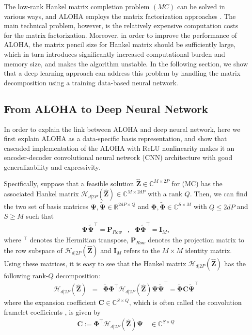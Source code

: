 \documentclass[num-refs]{wiley-article}
\newcommand{\Bb}{{\mathbf B}}
\newcommand{\Cb}{{\mathbf{C}}}
\newcommand{\Ib}{{\mathbf I}}
\newcommand{\Pb}{{\mathbf P}}
\newcommand{\Zb}{{\mathbf Z}}
\newcommand{\Phib}{{\boldsymbol {\Phi}}}
\newcommand{\Psib}{{\boldsymbol {\Psi}}}
\newcommand{\Rd}{{\mathbb R}}
\newcommand{\Cd}{{\mathbb C}}
\newcommand{\0}{{\boldsymbol{0}}}
\newcommand{\hank}{\mathscr{H}}
\newcommand{\1}{\blmath{1}}
\begin{document}
	
	The low-rank Hankel matrix completion problem $(MC)$ can be solved in various ways, and ALOHA employs
	the matrix factorization approaches  \cite{jin2016general,lee2016acceleration,Lee2016reference}. 
	The main technical problem, however, is the relatively expensive computation costs for the matrix factorization.
	Moreover, in order to improve the performance of ALOHA, the  matrix pencil size for Hankel matrix should  be sufficiently large, which in turn introduces significantly increased computational burden and memory size, and makes the algorithm unstable.
	In the following section, we show that a deep learning approach can address this problem by handling the matrix decomposition using a training data-based neural network.
	
	
	\subsection{From ALOHA to Deep Neural Network} 
	
	In order to explain the link between ALOHA and deep neural network, 
	here we first explain ALOHA as a data-specific basis representation, and  show that cascaded implementation of the
	ALOHA with ReLU nonlinearity makes it an encoder-decoder convolutional neural network  (CNN) architecture with
	good generalizability and expressivity.
	
	
	Specifically, suppose that a feasible solution  $\hat\Zb \in \Cd^{M\times 2P}$ for (MC)  has  the associated Hankel matrix
	$\hank_{d|2P}(\widehat\Zb) \in \Cd^{M\times 2dP}$ with a rank $Q$.
	Then, we can find the two set of basis matrices
	$\Psib, \widetilde{\Psib}\in \Rd^{2dP \times Q}$  and  $\Phib, \widetilde{\Phib} \in \Cd^{S \times M}$ with $Q\leq 2dP$ and $S\geq M$
	such that
	\begin{eqnarray}\label{eq:projection}
	\Psib \widetilde \Psib^{\top} = \Pb_{Row}&,& \Phib \widetilde \Phib^{\top} = \Ib_{M},
	\end{eqnarray}
	where $^\top$ denotes the Hermitian transpose,
	$\Pb_{Row}$ denotes the projection matrix to the row subspace of $\hank_{d|2P}(\hat \Zb)$ and $\Ib_M$ refers to the $M\times M$ identity matrix.
	Using these matrices, it is easy to see that 
	the Hankel matrix $\hank_{d|2P}(\widehat\Zb)$ has the following rank-$Q$ decomposition:
	\begin{eqnarray}
	\hank_{d|2P}\left(\widehat \Zb \right) &=& \widetilde\Phib \Phib^{\top}\hank_{d|2P}\left(\widehat \Zb \right) \Psib \tilde \Psib^{\top} =  \widetilde\Phib \Cb \tilde \Psib^{\top} \label{eq:Hdec} 
	\end{eqnarray}
	where  the expansion coefficient  $\Cb \in \Cd^{S\times Q}$, which is often called the convolution framelet coefficients \cite{ye2018deep},
	is given by
	\begin{eqnarray}\label{eq:Henc}
	\Cb := \Phib^{\top}\hank_{d|2P}\left(\widehat\Zb\right) \Psib   \quad \in \Cd^{S\times Q}
	\end{eqnarray}
	
\end{document}
